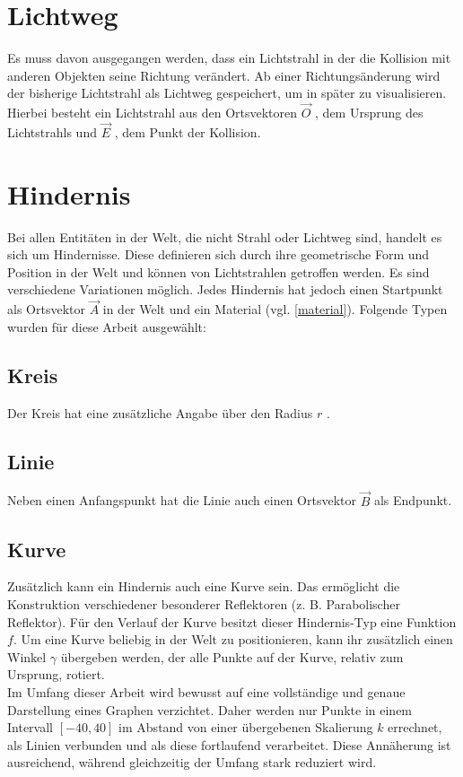 \section{Lichtweg}
Es muss davon ausgegangen werden, dass ein Lichtstrahl in der 
die Kollision mit anderen Objekten seine Richtung verändert. 
Ab einer Richtungsänderung wird der bisherige Lichtstrahl als Lichtweg  
gespeichert, um in später zu visualisieren.
Hierbei besteht ein Lichtstrahl aus den Ortsvektoren $ \vec{O} $ , dem 
Ursprung des Lichtstrahls und $ \vec{E} $ , dem Punkt der Kollision.

\section{Hindernis}
Bei allen Entitäten in der Welt, die nicht Strahl oder Lichtweg sind, 
handelt es sich um Hindernisse. 
Diese definieren sich durch ihre geometrische Form und Position in der Welt 
und können von Lichtstrahlen getroffen werden.
Es sind verschiedene Variationen möglich. Jedes Hindernis  
hat jedoch einen Startpunkt als Ortsvektor $ \vec{A} $  in der Welt
und ein Material  (vgl. \ref{material}). 
Folgende Typen wurden für diese Arbeit ausgewählt: 

\subsection{Kreis}
Der Kreis  hat eine zusätzliche Angabe über den Radius $ r $ .

\subsection{Linie}
Neben einen Anfangspunkt hat die Linie  auch einen Ortsvektor $ \vec{B} $ als Endpunkt. 

\subsection{Kurve}
Zusätzlich kann ein Hindernis auch eine Kurve  sein. 
Das ermöglicht die Konstruktion verschiedener besonderer Reflektoren (z. B. Parabolischer Reflektor).
Für den Verlauf der Kurve besitzt dieser Hindernis-Typ eine Funktion $ f $. 
Um eine Kurve beliebig in der Welt zu positionieren, kann 
ihr zusätzlich einen Winkel $ \gamma $  übergeben werden, 
der alle Punkte auf der Kurve, relativ zum Ursprung, rotiert. \\
Im Umfang dieser Arbeit wird bewusst auf eine vollständige und genaue Darstellung eines Graphen verzichtet. 
Daher werden nur Punkte in einem Intervall $ [-40, 40] $ im Abstand von einer übergebenen Skalierung $ k $  errechnet, 
als Linien verbunden und als diese fortlaufend verarbeitet. 
Diese Annäherung ist ausreichend, während gleichzeitig der Umfang stark reduziert wird.



